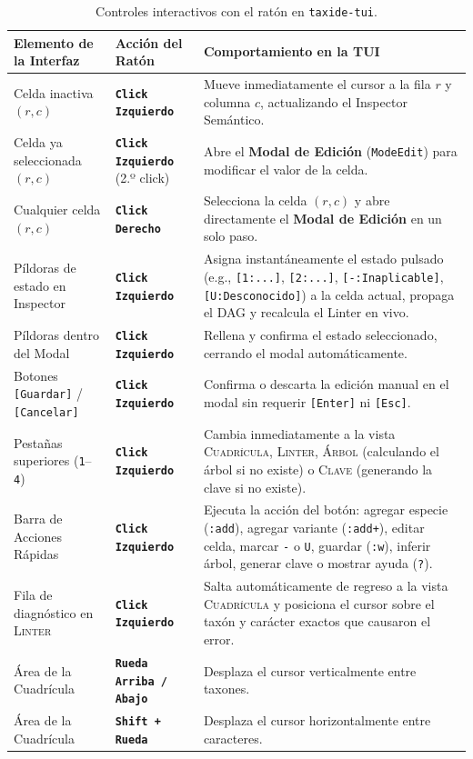 \documentclass[11pt,a4paper]{article}
\newcommand{\keystroke}[1]{\texttt{[#1]}}
\newcommand{\mousebtn}[1]{\textbf{\texttt{#1}}}
\begin{document}
\begin{table}[ht]
\centering
\small
\caption{Controles interactivos con el ratón en \texttt{taxide-tui}.}
\label{tab:mouse}
\begin{tabularx}{\textwidth}{@{}l l X@{}}
\toprule
\textbf{Elemento de la Interfaz} & \textbf{Acción del Ratón} & \textbf{Comportamiento en la TUI} \\
\midrule
Celda inactiva $(r, c)$ & \mousebtn{Click Izquierdo} & Mueve inmediatamente el cursor a la fila $r$ y columna $c$, actualizando el Inspector Semántico. \\
Celda ya seleccionada $(r, c)$ & \mousebtn{Click Izquierdo} (2.º click) & Abre el \textbf{Modal de Edición} (\texttt{ModeEdit}) para modificar el valor de la celda. \\
Cualquier celda $(r, c)$ & \mousebtn{Click Derecho} & Selecciona la celda $(r, c)$ y abre directamente el \textbf{Modal de Edición} en un solo paso. \\
Píldoras de estado en Inspector & \mousebtn{Click Izquierdo} & Asigna instantáneamente el estado pulsado (e.g., \texttt{[1:...]}, \texttt{[2:...]}, \texttt{[-:Inaplicable]}, \texttt{[U:Desconocido]}) a la celda actual, propaga el DAG y recalcula el Linter en vivo. \\
Píldoras dentro del Modal & \mousebtn{Click Izquierdo} & Rellena y confirma el estado seleccionado, cerrando el modal automáticamente. \\
Botones \texttt{[Guardar]} / \texttt{[Cancelar]} & \mousebtn{Click Izquierdo} & Confirma o descarta la edición manual en el modal sin requerir \keystroke{Enter} ni \keystroke{Esc}. \\
Pestañas superiores (\texttt{1}--\texttt{4}) & \mousebtn{Click Izquierdo} & Cambia inmediatamente a la vista \textsc{Cuadrícula}, \textsc{Linter}, \textsc{Árbol} (calculando el árbol si no existe) o \textsc{Clave} (generando la clave si no existe). \\
Barra de Acciones Rápidas & \mousebtn{Click Izquierdo} & Ejecuta la acción del botón: agregar especie (\texttt{:add}), agregar variante (\texttt{:add+}), editar celda, marcar \texttt{-} o \texttt{U}, guardar (\texttt{:w}), inferir árbol, generar clave o mostrar ayuda (\texttt{?}). \\
Fila de diagnóstico en \textsc{Linter} & \mousebtn{Click Izquierdo} & Salta automáticamente de regreso a la vista \textsc{Cuadrícula} y posiciona el cursor sobre el taxón y carácter exactos que causaron el error. \\
Área de la Cuadrícula & \mousebtn{Rueda Arriba / Abajo} & Desplaza el cursor verticalmente entre taxones. \\
Área de la Cuadrícula & \mousebtn{Shift + Rueda} & Desplaza el cursor horizontalmente entre caracteres. \\
\bottomrule
\end{tabularx}
\end{table}
\end{document}
